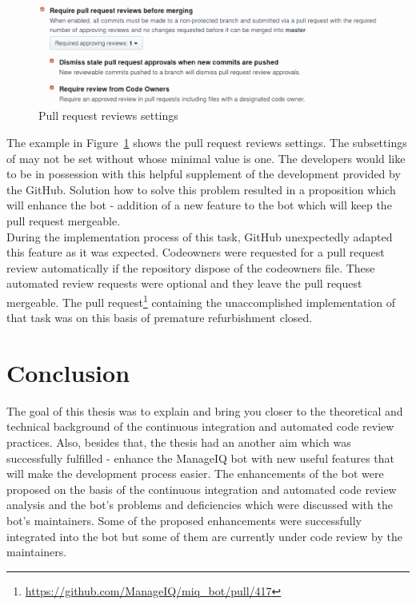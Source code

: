 \begin{figure}[H]
    \centering
    \includegraphics[scale=0.25]{img/codeowners_settings.pdf}
    \caption{Pull request reviews settings}
    \label{fig:codeowners_settings}
\end{figure}

The example in Figure~\ref{fig:codeowners_settings} shows the pull request reviews settings. The subsettings of  may not be set without  whose minimal value is one. The developers would like to be in possession with this helpful supplement of the development provided by the GitHub. Solution how to solve this problem resulted in a proposition which will enhance the bot - addition of a new feature to the bot which will keep the pull request mergeable.\\

During the implementation process of this task, GitHub unexpectedly adapted this feature as it was expected. Codeowners were requested for a pull request review automatically if the repository dispose of the codeowners file. These automated review requests were optional and they leave the pull request mergeable. The pull request\footnote{\url{https://github.com/ManageIQ/miq_bot/pull/417}} containing the unaccomplished implementation of that task was on this basis of premature refurbishment closed.

\chapter{Conclusion}

The goal of this thesis was to explain and bring you closer to the theoretical and technical background of the continuous integration and automated code review practices. Also, besides that, the thesis had an another aim which was successfully fulfilled - enhance the ManageIQ bot with new useful features that will make the development process easier. The enhancements of the bot were proposed on the basis of the continuous integration and automated code review analysis and the bot's problems and deficiencies which were discussed with the bot's maintainers. Some of the proposed enhancements were successfully integrated into the bot but some of them are currently under code review by the maintainers.\\

